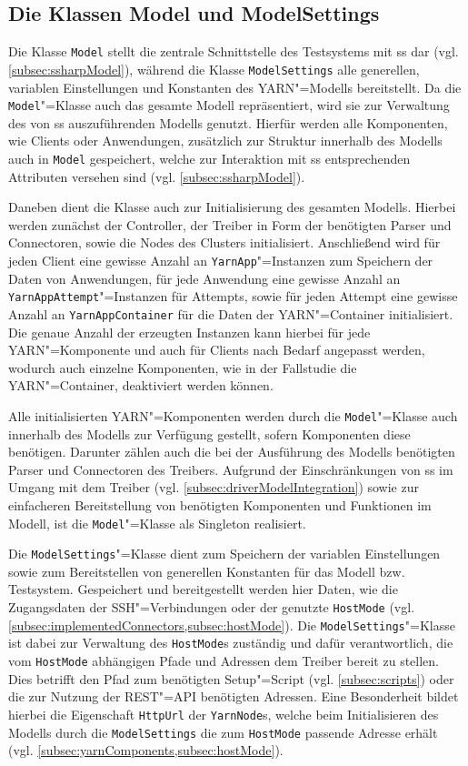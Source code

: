 \subsection{Die Klassen Model und ModelSettings}
\label{subsec:modelClass}

Die Klasse \texttt{Model} stellt die zentrale Schnittstelle des Testsystems mit \gls{ss} dar (vgl. \cref{subsec:ssharpModel}), während die Klasse \texttt{ModelSettings} alle generellen, variablen Einstellungen und Konstanten des YARN"=Modells bereitstellt.
Da die \texttt{Model}"=Klasse auch das gesamte Modell repräsentiert, wird sie zur Verwaltung des von \gls{ss} auszuführenden Modells genutzt.
Hierfür werden alle Komponenten, wie Clients oder Anwendungen, zusätzlich zur Struktur innerhalb des Modells auch in \texttt{Model} gespeichert, welche zur Interaktion mit \gls{ss} entsprechenden Attributen versehen sind (vgl. \cref{subsec:ssharpModel}).

Daneben dient die Klasse auch zur Initialisierung des gesamten Modells.
Hierbei werden zunächst der Controller, der Treiber in Form der benötigten Parser und Connectoren, sowie die Nodes des Clusters initialisiert.
Anschließend wird für jeden Client eine gewisse Anzahl an \texttt{YarnApp}"=Instanzen zum Speichern der Daten von Anwendungen, für jede Anwendung eine gewisse Anzahl an \texttt{YarnAppAttempt}"=Instanzen für Attempts, sowie für jeden Attempt eine gewisse Anzahl an \texttt{YarnAppContainer} für die Daten der YARN"=Container initialisiert.
Die genaue Anzahl der erzeugten Instanzen kann hierbei für jede YARN"=Komponente und auch für Clients nach Bedarf angepasst werden, wodurch auch einzelne Komponenten, wie \zB in der Fallstudie die YARN"=Container, deaktiviert werden können.

Alle initialisierten YARN"=Komponenten werden durch die \texttt{Model}"=Klasse auch innerhalb des Modells zur Verfügung gestellt, sofern Komponenten diese benötigen.
Darunter zählen auch die bei der Ausführung des Modells benötigten Parser und Connectoren des Treibers.
Aufgrund der Einschränkungen von \gls{ss} im Umgang mit dem Treiber (vgl. \cref{subsec:driverModelIntegration}) sowie zur einfacheren Bereitstellung von benötigten Komponenten und Funktionen im Modell, ist die \texttt{Model}"=Klasse als Singleton realisiert.

Die \texttt{ModelSettings}"=Klasse dient zum Speichern der variablen Einstellungen sowie zum Bereitstellen von generellen Konstanten für das Modell bzw. Testsystem.
Gespeichert und bereitgestellt werden hier Daten, wie \zB die Zugangsdaten der SSH"=Verbindungen oder der genutzte \texttt{HostMode} (vgl.  \cref{subsec:implementedConnectors,subsec:hostMode}).
Die \texttt{ModelSettings}"=Klasse ist dabei zur Verwaltung des \texttt{HostMode}s zuständig und dafür verantwortlich, die vom \texttt{HostMode} abhängigen Pfade und Adressen dem Treiber bereit zu stellen.
Dies betrifft \zB den Pfad zum benötigten Setup"=Script (vgl. \cref{subsec:scripts}) oder die zur Nutzung der REST"=API benötigten Adressen.
Eine Besonderheit bildet hierbei die Eigenschaft \texttt{HttpUrl} der \texttt{YarnNode}s, welche beim Initialisieren des Modells durch die \texttt{ModelSettings} die zum \texttt{HostMode} passende Adresse erhält (vgl. \cref{subsec:yarnComponents,subsec:hostMode}).

